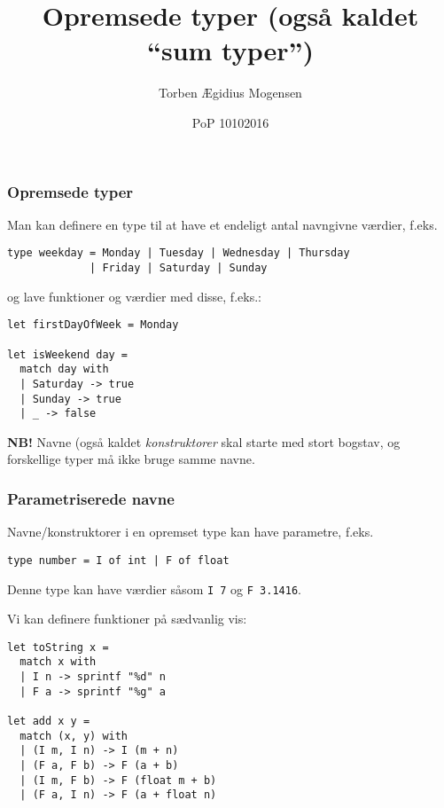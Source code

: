 \documentclass{beamer}
\title{Opremsede typer (også kaldet ``sum typer'')}
\date[2016]{PoP 10102016}
\author{Torben Ægidius Mogensen}
\begin{document}
\begin{frame}
\titlepage
\end{frame}






\begin{frame}[fragile=singleslide]
\frametitle{Opremsede typer}

Man kan definere en type til at have et endeligt antal navngivne
værdier, f.eks.
\begin{verbatim}
type weekday = Monday | Tuesday | Wednesday | Thursday
             | Friday | Saturday | Sunday
\end{verbatim}

og lave funktioner og værdier med disse, f.eks.:
\begin{verbatim}
let firstDayOfWeek = Monday

let isWeekend day =
  match day with
  | Saturday -> true
  | Sunday -> true
  | _ -> false
\end{verbatim}

\textbf{NB!} Navne (også kaldet \emph{konstruktorer} skal starte med
stort bogstav, og forskellige typer må ikke bruge samme navne.

\end{frame}

\begin{frame}[fragile=singleslide]
\frametitle{Parametriserede navne}

Navne/konstruktorer i en opremset type kan have parametre, f.eks.

\begin{verbatim}
type number = I of int | F of float
\end{verbatim}

Denne type kan have værdier såsom \texttt{I 7} og \texttt{F 3.1416}.

Vi kan definere funktioner på sædvanlig vis:


\begin{verbatim}
let toString x =
  match x with
  | I n -> sprintf "%d" n
  | F a -> sprintf "%g" a

let add x y =
  match (x, y) with
  | (I m, I n) -> I (m + n)
  | (F a, F b) -> F (a + b)
  | (I m, F b) -> F (float m + b)
  | (F a, I n) -> F (a + float n)
\end{verbatim}


\end{frame}
\end{document}
